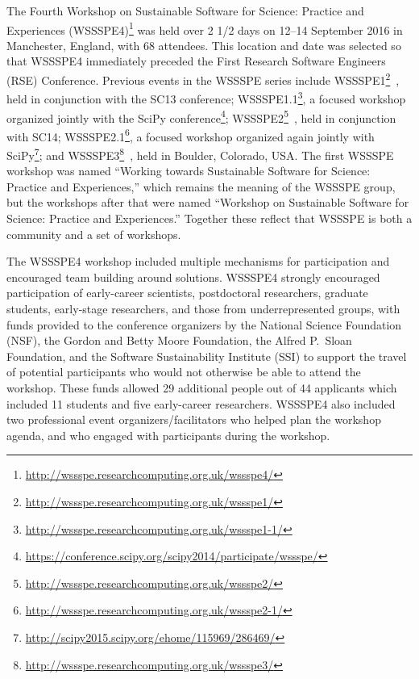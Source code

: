 \documentclass[11pt, oneside]{amsart}
\newcommand{\todo}[1]{{\color{blue}$\blacksquare$~\textsf{[TODO: #1]}}}
\begin{document}
The Fourth Workshop on Sustainable Software for Science: Practice and Experiences
(WSSSPE4)\footnote{\url{http://wssspe.researchcomputing.org.uk/wssspe4/}} was
held over 2 1/2 days on 12--14 September 2016 in Manchester, England, with 68 attendees.
This location and date was selected so that WSSSPE4 immediately preceded the
First Research Software Engineers (RSE) Conference.
Previous events in the WSSSPE series include
WSSSPE1\footnote{\url{http://wssspe.researchcomputing.org.uk/wssspe1/}}~\cite{WSSSPE1-pre-report,WSSSPE1},
held in conjunction with the SC13 conference;
WSSSPE1.1\footnote{\url{http://wssspe.researchcomputing.org.uk/wssspe1-1/}}, a
focused workshop organized jointly with the SciPy
conference\footnote{\url{https://conference.scipy.org/scipy2014/participate/wssspe/}};
WSSSPE2\footnote{\url{http://wssspe.researchcomputing.org.uk/wssspe2/}}~\cite{WSSSPE2-pre-report,WSSSPE2},
held in conjunction with SC14;
WSSSPE2.1\footnote{\url{http://wssspe.researchcomputing.org.uk/wssspe2-1/}}, a
focused workshop organized again jointly with
SciPy\footnote{\url{http://scipy2015.scipy.org/ehome/115969/286469/}};
and WSSSPE3\footnote{\url{http://wssspe.researchcomputing.org.uk/wssspe3/}}~\cite{WSSSPE3},
held in Boulder, Colorado, USA.
The first WSSSPE workshop was named
``Working towards
Sustainable Software for Science: Practice and Experiences,'' which remains the meaning
of the WSSSPE group, but the workshops after that were named
``Workshop on Sustainable
Software for Science: Practice and Experiences.'' Together these reflect
that WSSSPE is both a community and a set of workshops.


The WSSSPE4 workshop included multiple mechanisms for participation and
encouraged team building around solutions. WSSSPE4 strongly encouraged participation
of early-career scientists, postdoctoral researchers, graduate students,
early-stage researchers, and those from underrepresented groups,
with funds provided to the conference organizers by the National Science
Foundation (NSF), the Gordon and Betty Moore Foundation, the Alfred P.~Sloan Foundation, and the Software
Sustainability Institute (SSI) to support the travel of potential participants
who would not otherwise be able to attend the workshop. These
funds allowed 29 additional people %
out of 44 applicants which 
included 11 students and five early-career
researchers.
%
WSSSPE4 also included two professional event organizers/facilitators who helped
plan the workshop agenda,
and who engaged with participants during the workshop.
\end{document}
